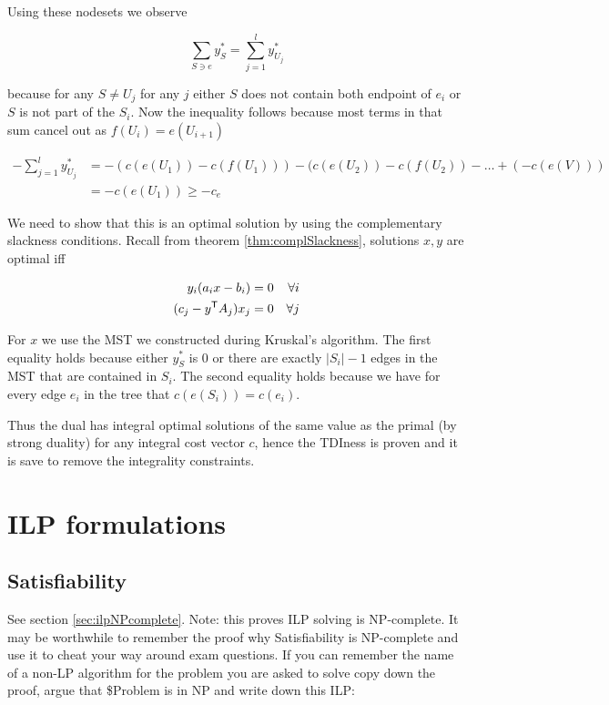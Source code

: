 Using these nodesets we observe

\[\sum_{S\ni e} y_S^* = \sum_{j=1}^l y_{U_j}^*\]

because for any $S\neq U_j$ for any $j$ either $S$ does not contain both endpoint of $e_i$ or $S$ is not part of the $S_i$. Now the inequality follows because most terms in that sum cancel out as $f(U_i)=e(U_{i+1})$

\begin{align*}
-\sum_{j=1}^l y_{U_j}^* &= -(c(e(U_1)) - c(f(U_1))) - (c(e(U_2)) - c(f(U_2)) - \ldots + (-c(e(V)))\\
	&=-c(e(U_1)) \geq -c_e
\end{align*}

We need to show that this is an optimal solution by using the complementary slackness conditions. Recall from theorem \ref{thm:complSlackness}, solutions $x,y$ are optimal iff

\begin{align*}
y_i(a_ix-b_i) = 0 && \forall i\\ 
(c_j - {y}^\text{\upshape \sffamily T}A_j)x_j =0 && \forall j
\end{align*}

For $x$ we use the MST we constructed during Kruskal's algorithm. The first equality holds because either $y_S^*$ is 0 or there are exactly $|S_i|-1$ edges in the MST that are contained in $S_i$. The second equality holds because we have for every edge $e_i$ in the tree that $c(e(S_i))=c(e_i)$.

Thus the dual has integral optimal solutions of the same value as the primal (by strong duality) for any integral cost vector $c$, hence the TDIness is proven and it is save to remove the integrality constraints.


\section{ILP formulations}

\subsection{Satisfiability}
See section \ref{sec:ilpNPcomplete}. Note: this proves ILP solving is NP-complete. It may be worthwhile to remember the proof why Satisfiability is NP-complete and use it to cheat your way around exam questions. If you can remember the name of a non-LP algorithm for the problem you are asked to solve copy down the proof, argue that \$Problem is in NP and write down this ILP:

